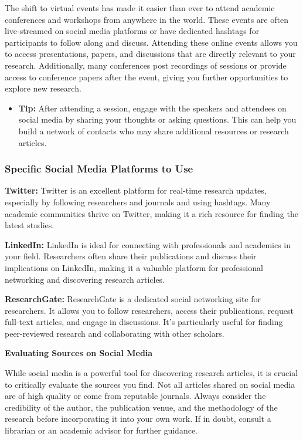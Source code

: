 \documentclass[
]{book}
\providecommand{\tightlist}{%
  \setlength{\itemsep}{0pt}\setlength{\parskip}{0pt}}
\begin{document}
The shift to virtual events has made it easier than ever to attend academic conferences and workshops from anywhere in the world. These events are often live-streamed on social media platforms or have dedicated hashtags for participants to follow along and discuss. Attending these online events allows you to access presentations, papers, and discussions that are directly relevant to your research. Additionally, many conferences post recordings of sessions or provide access to conference papers after the event, giving you further opportunities to explore new research.

\begin{itemize}
\tightlist
\item
  \textbf{Tip:} After attending a session, engage with the speakers and attendees on social media by sharing your thoughts or asking questions. This can help you build a network of contacts who may share additional resources or research articles.
\end{itemize}

\subsubsection*{Specific Social Media Platforms to Use}\label{specific-social-media-platforms-to-use}

\textbf{Twitter:} Twitter is an excellent platform for real-time research updates, especially by following researchers and journals and using hashtags. Many academic communities thrive on Twitter, making it a rich resource for finding the latest studies.

\textbf{LinkedIn:} LinkedIn is ideal for connecting with professionals and academics in your field. Researchers often share their publications and discuss their implications on LinkedIn, making it a valuable platform for professional networking and discovering research articles.

\textbf{ResearchGate:} ResearchGate is a dedicated social networking site for researchers. It allows you to follow researchers, access their publications, request full-text articles, and engage in discussions. It's particularly useful for finding peer-reviewed research and collaborating with other scholars.

\textbf{Evaluating Sources on Social Media}

While social media is a powerful tool for discovering research articles, it is crucial to critically evaluate the sources you find. Not all articles shared on social media are of high quality or come from reputable journals. Always consider the credibility of the author, the publication venue, and the methodology of the research before incorporating it into your own work. If in doubt, consult a librarian or an academic advisor for further guidance.
\end{document}
